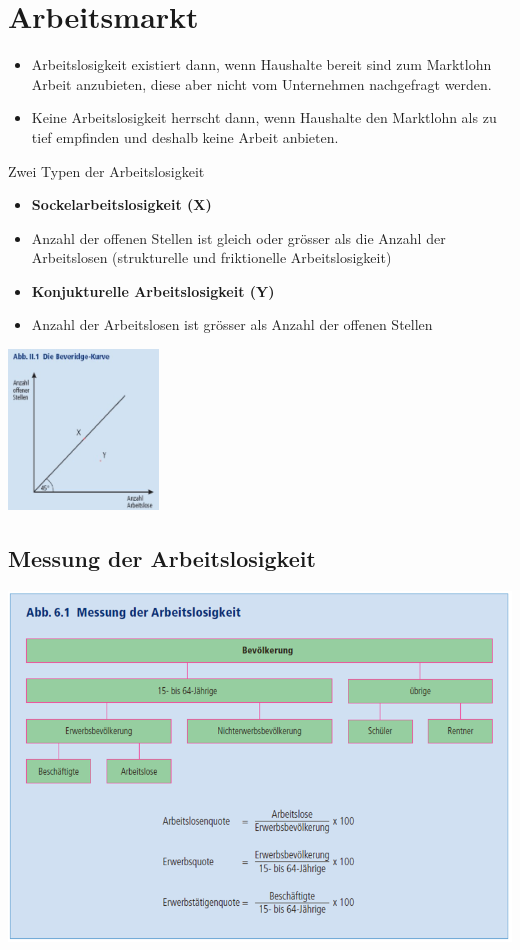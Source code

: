 \section{Arbeitsmarkt}
\begin{itemize}
	\item Arbeitslosigkeit existiert dann, wenn Haushalte bereit sind zum Marktlohn Arbeit anzubieten, diese aber nicht vom Unternehmen nachgefragt werden.
	\item Keine Arbeitslosigkeit herrscht dann, wenn Haushalte den Marktlohn als zu tief empfinden und deshalb keine Arbeit anbieten.
\end{itemize}
Zwei Typen der Arbeitslosigkeit\\
\begin{minipage}{12cm}
	\begin{itemize}
		\item \textbf{Sockelarbeitslosigkeit (X)}
		\item Anzahl der offenen Stellen ist gleich oder grösser als die Anzahl der Arbeitslosen (strukturelle und friktionelle Arbeitslosigkeit)
		\item \textbf{Konjukturelle Arbeitslosigkeit (Y)}
		\item Anzahl der Arbeitslosen ist grösser als Anzahl der offenen Stellen
	\end{itemize}
\end{minipage}
\begin{minipage}{5cm}
	\includegraphics[width=4cm]{images/beveridge.jpg}
\end{minipage}
\subsection{Messung der Arbeitslosigkeit}
\includegraphics[width=0.8\linewidth]{images/messung.png}
